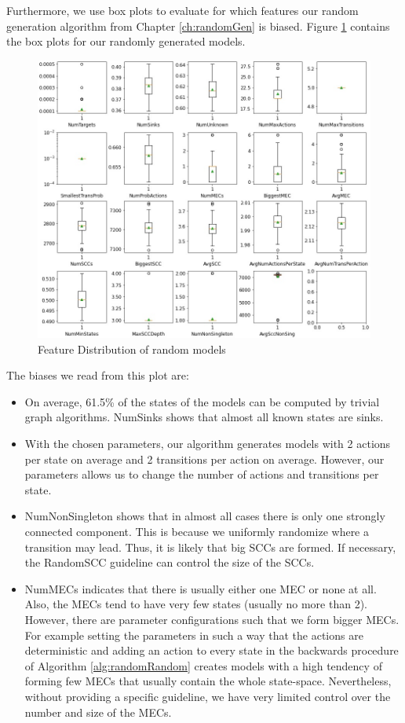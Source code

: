 Furthermore, we use box plots to evaluate for which features our random generation algorithm from Chapter \ref{ch:randomGen} is biased.
Figure \ref{fig:Random_FeatureDistribution} contains the box plots for our randomly generated models.
\begin{figure}[h!]
    \centering
    \includegraphics[width=1\textwidth]{figures/RandomRandom_FeatureDistribution.png}
    \caption[Feature Distribution of random models]{
        Feature Distribution of random models
    }
    \label{fig:Random_FeatureDistribution}
\end{figure}
\FloatBarrier

The biases we read from this plot are:
\begin{itemize}
    \item On average, 61.5\% of the states of the models can be computed by trivial graph algorithms. NumSinks shows that almost all known states are sinks.
    \item With the chosen parameters, our algorithm generates models with 2 actions per state on average
     and 2 transitions per action on average.     
     However, our parameters allows us to change the number of actions and transitions per state.
    \item NumNonSingleton shows that in almost all cases there is only one strongly connected component.
        This is because we uniformly randomize where a transition may lead. Thus, it is likely that big SCCs are formed. 
        If necessary, the RandomSCC guideline can control the size of the SCCs.
    \item NumMECs indicates that there is usually either one MEC or none at all. Also, the MECs tend to have very few states (usually no more than 2).
    However, there are parameter configurations such that we form bigger MECs. For example setting the parameters in such a way that the actions are deterministic
    and adding an action to every state in the backwards procedure of Algorithm \ref{alg:randomRandom} creates models with a high tendency of forming few MECs that usually contain the whole state-space.
    Nevertheless, without providing a specific guideline, we have very limited control over the number and size of the MECs.
\end{itemize}

